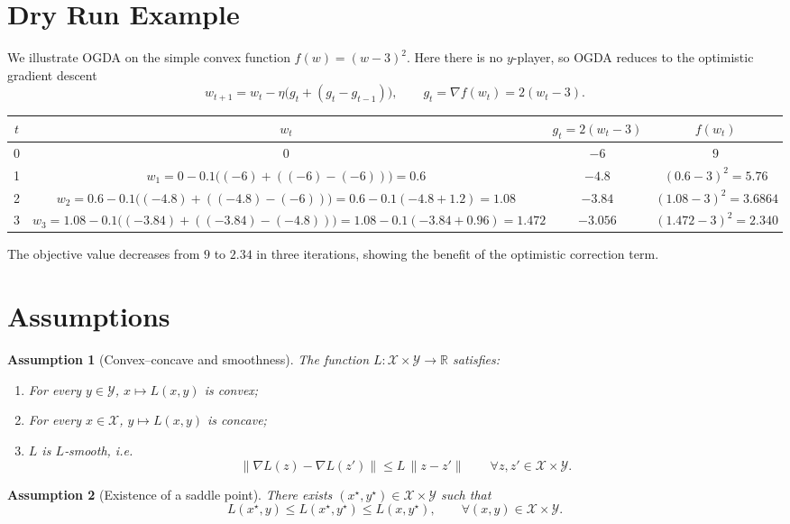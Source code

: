 \documentclass{article}
\newtheorem{assumption}{Assumption}
\newcommand{\R}{\mathbb{R}}
\begin{document}
\section*{Dry Run Example}
We illustrate OGDA on the simple convex function $f(w)=(w-3)^{2}$.
Here there is no $y$-player, so OGDA reduces to the optimistic gradient descent
\[
w_{t+1}=w_{t}-\eta\bigl(g_{t}+ (g_{t}-g_{t-1})\bigr),\qquad 
g_{t}= \nabla f(w_{t})=2(w_{t}-3).
\]

\begin{center}
\begin{tabular}{c|c|c|c}
$t$ & $w_{t}$ & $g_{t}=2(w_{t}-3)$ & $f(w_{t})$\\\hline
0 & $0$ & $-6$ & $9$\\
1 & $w_{1}=0-0.1\bigl((-6)+((-6)-(-6))\bigr)=0.6$ & $-4.8$ & $(0.6-3)^{2}=5.76$\\
2 & $w_{2}=0.6-0.1\bigl((-4.8)+((-4.8)-(-6))\bigr)=0.6-0.1(-4.8+1.2)=1.08$ &
$-3.84$ & $(1.08-3)^{2}=3.6864$\\
3 & $w_{3}=1.08-0.1\bigl((-3.84)+((-3.84)-(-4.8))\bigr)=1.08-0.1(-3.84+0.96)=1.472$ &
$-3.056$ & $(1.472-3)^{2}=2.340$\\
\end{tabular}
\end{center}
The objective value decreases from $9$ to $2.34$ in three iterations,
showing the benefit of the optimistic correction term.

\newpage
\section*{Assumptions}
\begin{assumption}[Convex–concave and smoothness]\label{ass:convex}
The function $L:\mathcal{X}\times\mathcal{Y}\to\R$ satisfies:
\begin{enumerate}[label=(\roman*)]
\item For every $y\in\mathcal{Y}$, $x\mapsto L(x,y)$ is convex;
\item For every $x\in\mathcal{X}$, $y\mapsto L(x,y)$ is concave;
\item $L$ is $L$‑smooth, i.e.
\[
\|\nabla L(z)-\nabla L(z')\| \le L\,\|z-z'\|\qquad\forall z,z'\in\mathcal{X}\times\mathcal{Y}.
\tag{1}
\]
\end{enumerate}
\end{assumption}

\begin{assumption}[Existence of a saddle point]\label{ass:saddle}
There exists $(x^{\star},y^{\star})\in\mathcal{X}\times\mathcal{Y}$ such that
\[
L(x^{\star},y)\le L(x^{\star},y^{\star})\le L(x,y^{\star}),\qquad\forall (x,y)\in\mathcal{X}\times\mathcal{Y}.
\tag{2}
\]
\end{assumption}
\end{document}
